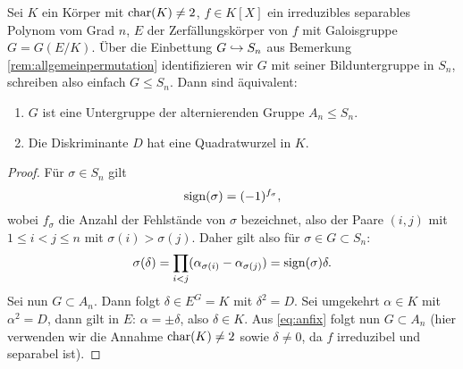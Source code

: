 \documentclass{book}
\begin{document}
\begin{thm}
    \label{thm:diskan}
    Sei $K$ ein Körper mit $\operatorname{char}(K) \ne 2$, $f \in K[X]$ ein irreduzibles separables Polynom vom
    Grad $n$, $E$ der Zerfällungskörper von $f$ mit Galoisgruppe $G = G(E/K)$.
    Über die Einbettung $G \hookrightarrow S_n$ aus Bemerkung
    \ref{rem:allgemeinpermutation} identifizieren wir $G$ mit seiner
    Bilduntergruppe in $S_n$, schreiben also einfach $G \le S_n$. Dann sind äquivalent:
    \begin{enumerate}[label=(\roman *)]
        \item $G$ ist eine Untergruppe der alternierenden Gruppe $A_n \le S_n$.
        \item Die Diskriminante $D$ hat eine Quadratwurzel in $K$. 
    \end{enumerate}
\end{thm}
\begin{proof}
    Für $\sigma \in S_n$ gilt
    \[
        \operatorname{sign}(\sigma) = (-1)^{f_\sigma},
    \]
    wobei $f_\sigma$ die Anzahl der Fehlstände von $\sigma$ bezeichnet, also
    der Paare $(i,j)$ mit $1 \le i < j \le n$ mit $\sigma(i) > \sigma(j)$.
    Daher gilt also für $\sigma \in G \subset S_n$:
    \begin{equation}\label{eq:anfix}
            \sigma(\delta) = \prod_{i < j} (\alpha_{\sigma(i)} - \alpha_{\sigma(j)}) = \operatorname{sign}(\sigma) \delta.
    \end{equation}
    Sei nun $G \subset A_n$. Dann folgt $\delta \in E^G  = K$ mit $\delta^2 =
    D$. Sei umgekehrt $\alpha \in K$ mit $\alpha^2 = D$, dann gilt in $E$: $\alpha =
    \pm \delta$, also $\delta \in K$. Aus \eqref{eq:anfix} folgt nun $G \subset
    A_n$ (hier verwenden wir die Annahme $\operatorname{char}(K) \ne 2$ sowie $\delta \ne
    0$, da $f$ irreduzibel und separabel ist). 
\end{proof}
\end{document}
